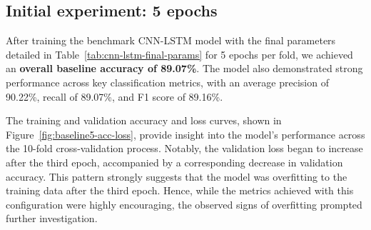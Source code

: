 \subsection{Initial experiment: 5 epochs}

After training the benchmark CNN-LSTM model with the final parameters detailed in Table~\ref{tab:cnn-lstm-final-params} for 5 epochs per fold, we achieved an \textbf{overall baseline accuracy of 89.07\%}. The model also demonstrated strong performance across key classification metrics, with an average precision of 90.22\%, recall of 89.07\%, and F1 score of 89.16\%.

The training and validation accuracy and loss curves, shown in Figure~\ref{fig:baseline5-acc-loss}, provide insight into the model's performance across the 10-fold cross-validation process. Notably, the validation loss began to increase after the third epoch, accompanied by a corresponding decrease in validation accuracy. This pattern strongly suggests that the model was overfitting to the training data after the third epoch. Hence, while the metrics achieved with this configuration were highly encouraging, the observed signs of overfitting prompted further investigation.


